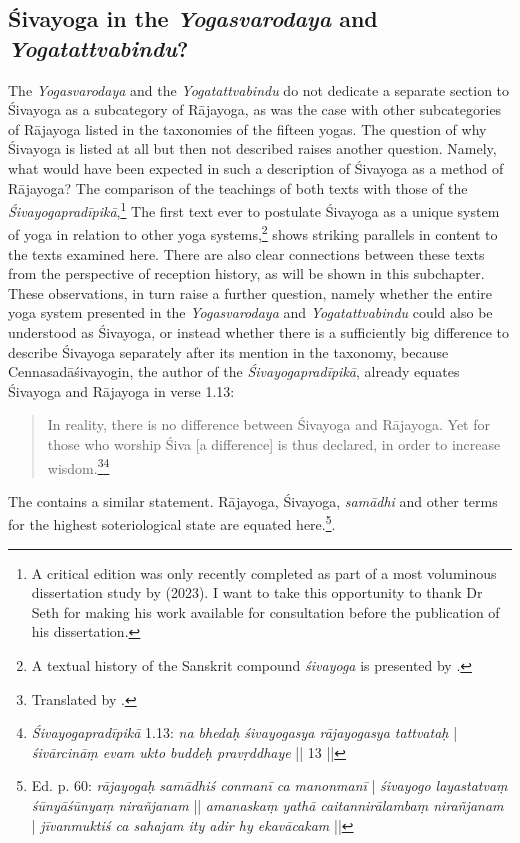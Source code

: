 \subsection{Śivayoga in the \textit{Yogasvarodaya} and \textit{Yogatattvabindu}?}
\label{sivayogaintro2}
The \textit{Yogasvarodaya} and the \textit{Yogatattvabindu} do not dedicate a separate section to Śivayoga as a subcategory of Rājayoga, as was the case with other subcategories of Rājayoga listed in the taxonomies of the fifteen yogas. The question of why Śivayoga is listed at all but then not described raises another question. Namely, what would have been expected in such a description of Śivayoga as a method of Rājayoga? The comparison of the teachings of both texts with those of the \textit{Śivayogapradīpikā},\footnote{A critical edition was only recently completed as part of a most voluminous dissertation study by \citeauthor{powell2023} (2023). I want to take this opportunity to thank Dr Seth \citeauthor{powell2023} for making his work available for consultation before the publication of his dissertation.} The first text ever to postulate Śivayoga as a unique system of yoga in relation to other yoga systems,\footnote{A textual history of the Sanskrit compound \textit{śivayoga} is presented by \citeauthor[2023: 48-57]{powell2023}.} shows striking parallels in content to the texts examined here. There are also clear connections between these texts from the perspective of reception history, as will be shown in this subchapter. These observations, in turn raise a further question, namely whether the entire yoga system presented in the \textit{Yogasvarodaya} and \textit{Yogatattvabindu} could also be understood as Śivayoga, or instead whether there is a sufficiently big difference to describe Śivayoga separately after its mention in the taxonomy, because Cennasadāśivayogin, the author of the \textit{Śivayogapradīpikā}, already equates Śivayoga and Rājayoga in verse 1.13:
\begin{quote}
In reality, there is no difference between Śivayoga and Rājayoga. Yet for those who worship Śiva [a difference] is thus declared, in order to increase wisdom.\footnote{Translated by \citeauthor[2023: 315]{powell2023}.}\footnote{\textit{Śivayogapradīpikā} 1.13: \textit{na bhedaḥ śivayogasya rājayogasya tattvataḥ} | \textit{śivārcināṃ evam ukto buddeḥ pravṛddhaye} || 13 ||} 
\end{quote}
The  contains a similar statement. Rājayoga, Śivayoga, \textit{samādhi} and other terms for the highest soteriological state are equated here.\footnote{ Ed. p. 60: \textit{rājayogaḥ samādhiś conmanī ca manonmanī} | \textit{śivayogo layastatvaṃ śūnyāśūnyaṃ nirañjanam} || \textit{amanaskaṃ yathā caitannirālambaṃ nirañjanam} | \textit{jīvanmuktiś ca sahajam ity adir hy ekavācakam} ||}.

